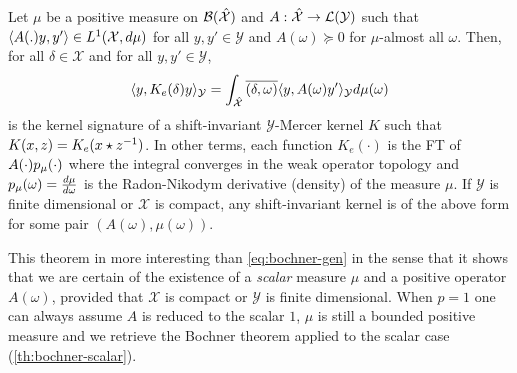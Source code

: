 \begin{proposition}\label{pr:mercer_kernel_bochner}
Let $\mu$ be a positive measure on $\mathcal{B}(\mathcal{\hat{\mathcal{X}}})$ and $A: \hat{\mathcal{X}}\to \mathcal{L}(\mathcal{Y})$ such that $\langle A(.)y,y'\rangle\in L^1(\mathcal{X},d\mu)$ for all $y,y'\in\mathcal{Y}$ and $A(\omega)\succcurlyeq 0$ for $\mu$-almost all $\omega$. Then, for all $\delta \in \mathcal{X}$ and for all $y, y' \in \mathcal{Y}$,
\begin{equation}
\label{eq:AK0}
\langle y,K_e(\delta)y\rangle_{\mathcal{Y}}=\int_{\hat{\mathcal{X}}}\overline{(\delta,\omega)}\langle y,A(\omega)y'\rangle_{\mathcal{Y}}d\mu(\omega)
\end{equation}
is the kernel signature of a shift-invariant $\mathcal{Y}$-Mercer kernel $K$ such that $K(x,z)=K_e(x \star {z}^{-1})$. In other terms, each function $K_e(\cdot)$ is the \acl{FT} of $A(\cdot)p_{\mu}(\cdot)$ where the integral converges in the weak operator topology and $p_{\mu}(\omega)=\frac{d\mu}{d\omega}$ is the Radon-Nikodym derivative (density) of the measure $\mu$. If $\mathcal{Y}$ is finite dimensional or $\mathcal{X}$ is compact, any shift-invariant kernel is of the above form for some pair $(A(\omega),\mu (\omega))$. 
\end{proposition}
This theorem in more interesting than \cref{eq:bochner-gen} in the sense that it shows that we are certain of the existence of a \emph{scalar} measure $\mu$ and a positive operator $A(\omega)$, provided that $\mathcal{X}$ is compact or $\mathcal{Y}$ is finite dimensional. When $p=1$ one can always assume $A$ is reduced to the scalar $1$, $\mu$ is still a bounded positive measure and we retrieve the Bochner theorem applied to the scalar case (\cref{th:bochner-scalar}).
